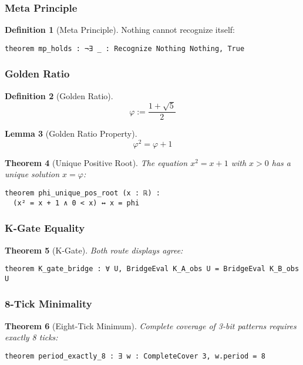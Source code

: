 \documentclass[11pt]{article}
\newtheorem{theorem}{Theorem}[section]
\newtheorem{lemma}[theorem]{Lemma}
\theoremstyle{definition}
\newtheorem{definition}[theorem]{Definition}
\theoremstyle{remark}
\begin{document}
\subsubsection{Meta Principle}

\begin{definition}[Meta Principle]
Nothing cannot recognize itself:
\begin{lstlisting}[language=lean]
theorem mp_holds : ¬∃ _ : Recognize Nothing Nothing, True
\end{lstlisting}
\end{definition}

\subsubsection{Golden Ratio}

\begin{definition}[Golden Ratio]
$$\varphi := \frac{1 + \sqrt{5}}{2}$$
\end{definition}

\begin{lemma}[Golden Ratio Property]
$$\varphi^2 = \varphi + 1$$
\end{lemma}

\begin{theorem}[Unique Positive Root]
\label{thm:phi-unique}
The equation $x^2 = x + 1$ with $x > 0$ has a unique solution $x = \varphi$:
\begin{lstlisting}[language=lean]
theorem phi_unique_pos_root (x : ℝ) :
  (x² = x + 1 ∧ 0 < x) ↔ x = phi
\end{lstlisting}
\end{theorem}

\subsubsection{K-Gate Equality}

\begin{theorem}[K-Gate]
Both route displays agree:
\begin{lstlisting}[language=lean]
theorem K_gate_bridge : ∀ U, BridgeEval K_A_obs U = BridgeEval K_B_obs U
\end{lstlisting}
\end{theorem}

\subsubsection{8-Tick Minimality}

\begin{theorem}[Eight-Tick Minimum]
Complete coverage of 3-bit patterns requires exactly 8 ticks:
\begin{lstlisting}[language=lean]
theorem period_exactly_8 : ∃ w : CompleteCover 3, w.period = 8
\end{lstlisting}
\end{theorem}
\end{document}
